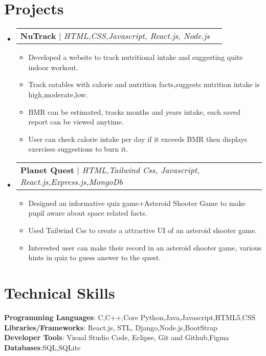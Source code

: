 \documentclass[letterpaper,11pt]{article}
\makeatletter
\newcommand{\resumeItem}[1]{
  \item\small{
    {#1 \vspace{-2pt}}
  }
}
\newcommand{\resumeProjectHeading}[2]{
    \item
    \begin{tabular*}{1.001\textwidth}{l@{\extracolsep{\fill}}r}
      \small#1 & \textbf{\small #2}\\
    \end{tabular*}\vspace{-7pt}
}
\newcommand{\resumeSubHeadingListStart}{\begin{itemize}[leftmargin=0.0in, label={}]}
\newcommand{\resumeSubHeadingListEnd}{\end{itemize}}
\newcommand{\resumeItemListStart}{\begin{itemize}}
\newcommand{\resumeItemListEnd}{\end{itemize}\vspace{-5pt}}
\makeatother
\begin{document}
\section{Projects}
    \vspace{-5pt}
    \resumeSubHeadingListStart
      \resumeProjectHeading
          {\textbf{NuTrack} $|$ \emph{HTML,CSS,Javascript, React.js, Node.js}}{}
          \resumeItemListStart
            \resumeItem{Developed a website to track nutritional intake and suggesting quite indoor workout.}
            \resumeItem{Track eatables with calorie and nutrition facts,suggests  nutrition intake is high,moderate,low.}
            \resumeItem{BMR can be estimated, tracks months and years intake, each saved report can be viewed anytime.}
            \resumeItem{User can check calorie intake per day if it exceeds BMR then displays exercises suggestions to burn it.}
          \resumeItemListEnd
          \vspace{-13pt}
          \resumeProjectHeading
          {\textbf{Planet Quest} $|$ \emph{HTML,Tailwind Css, Javascript, React.js,Express.js,MongoDb}}{}
          \resumeItemListStart
            \resumeItem{Designed an informative quiz game+Asteroid Shooter Game to make pupil aware about space related facts.}
            \resumeItem{Used Tailwind Css to create a attractive UI of an asteroid shooter game.}
            \resumeItem{Interested user can make their record in an asteroid shooter game, various hints in quiz to guess answer to the quest.}
          \resumeItemListEnd 
    \resumeSubHeadingListEnd
\vspace{-15pt}


%
\section{Technical Skills}
 \begin{itemize}[leftmargin=0.15in, label={}]
    \small{\item{
     \textbf{Programming Languages}{: C,C++,Core Python,Java,Javascript,HTML5,CSS} \\
      \textbf{Libraries/Frameworks}{: React.js, STL, Django,Node.js,BootStrap} \\
     \textbf{Developer Tools}{: Visual Studio Code, Eclipse, Git and Github,Figma} \\
     \textbf{Databases}{:SQL,SQLite } \\
    }}
 \end{itemize}
 \vspace{-16pt}
\end{document}
